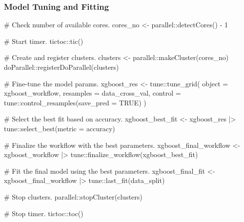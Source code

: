 \documentclass[
  letterpaper,
  DIV=11,
  numbers=noendperiod]{scrartcl}
\newenvironment{Shaded}{\begin{snugshade}}{\end{snugshade}}
\newcommand{\AttributeTok}[1]{\textcolor[rgb]{0.40,0.45,0.13}{#1}}
\newcommand{\CommentTok}[1]{\textcolor[rgb]{0.37,0.37,0.37}{#1}}
\newcommand{\ConstantTok}[1]{\textcolor[rgb]{0.56,0.35,0.01}{#1}}
\newcommand{\DecValTok}[1]{\textcolor[rgb]{0.68,0.00,0.00}{#1}}
\newcommand{\FunctionTok}[1]{\textcolor[rgb]{0.28,0.35,0.67}{#1}}
\newcommand{\NormalTok}[1]{\textcolor[rgb]{0.00,0.23,0.31}{#1}}
\newcommand{\OtherTok}[1]{\textcolor[rgb]{0.00,0.23,0.31}{#1}}
\newcommand{\SpecialCharTok}[1]{\textcolor[rgb]{0.37,0.37,0.37}{#1}}
\newcommand{\StringTok}[1]{\textcolor[rgb]{0.13,0.47,0.30}{#1}}
\begin{document}
\subsubsection{Model Tuning and
Fitting}\label{model-tuning-and-fitting-4}

\begin{Shaded}
\begin{Highlighting}[]
\CommentTok{\#\textquotesingle{} Check number of available cores.}
\NormalTok{cores\_no }\OtherTok{\textless{}{-}}\NormalTok{ parallel}\SpecialCharTok{::}\FunctionTok{detectCores}\NormalTok{() }\SpecialCharTok{{-}} \DecValTok{1}

\CommentTok{\#\textquotesingle{} Start timer.}
\NormalTok{tictoc}\SpecialCharTok{::}\FunctionTok{tic}\NormalTok{()}

\CommentTok{\# Create and register clusters.}
\NormalTok{clusters }\OtherTok{\textless{}{-}}\NormalTok{ parallel}\SpecialCharTok{::}\FunctionTok{makeCluster}\NormalTok{(cores\_no)}
\NormalTok{doParallel}\SpecialCharTok{::}\FunctionTok{registerDoParallel}\NormalTok{(clusters)}

\CommentTok{\# Fine{-}tune the model params.}
\NormalTok{xgboost\_res }\OtherTok{\textless{}{-}}\NormalTok{ tune}\SpecialCharTok{::}\FunctionTok{tune\_grid}\NormalTok{(}
  \AttributeTok{object =}\NormalTok{ xgboost\_workflow,}
  \AttributeTok{resamples =}\NormalTok{ data\_cross\_val,}
  \AttributeTok{control =}\NormalTok{ tune}\SpecialCharTok{::}\FunctionTok{control\_resamples}\NormalTok{(}\AttributeTok{save\_pred =} \ConstantTok{TRUE}\NormalTok{)}
\NormalTok{)}
\end{Highlighting}
\end{Shaded}

\begin{Shaded}
\begin{Highlighting}[]
\CommentTok{\# Select the best fit based on accuracy.}
\NormalTok{xgboost\_best\_fit }\OtherTok{\textless{}{-}} 
\NormalTok{  xgboost\_res }\SpecialCharTok{|\textgreater{}} 
\NormalTok{  tune}\SpecialCharTok{::}\FunctionTok{select\_best}\NormalTok{(}\AttributeTok{metric =} \StringTok{\textquotesingle{}accuracy\textquotesingle{}}\NormalTok{)}

\CommentTok{\# Finalize the workflow with the best parameters.}
\NormalTok{xgboost\_final\_workflow }\OtherTok{\textless{}{-}} 
\NormalTok{  xgboost\_workflow }\SpecialCharTok{|\textgreater{}}
\NormalTok{  tune}\SpecialCharTok{::}\FunctionTok{finalize\_workflow}\NormalTok{(xgboost\_best\_fit)}

\CommentTok{\# Fit the final model using the best parameters.}
\NormalTok{xgboost\_final\_fit }\OtherTok{\textless{}{-}} 
\NormalTok{  xgboost\_final\_workflow }\SpecialCharTok{|\textgreater{}} 
\NormalTok{  tune}\SpecialCharTok{::}\FunctionTok{last\_fit}\NormalTok{(data\_split)}

\CommentTok{\# Stop clusters.}
\NormalTok{parallel}\SpecialCharTok{::}\FunctionTok{stopCluster}\NormalTok{(clusters)}

\CommentTok{\# Stop timer.}
\NormalTok{tictoc}\SpecialCharTok{::}\FunctionTok{toc}\NormalTok{()}
\end{Highlighting}
\end{Shaded}
\end{document}
